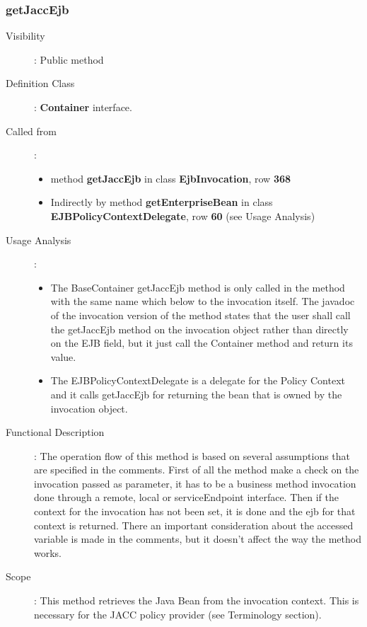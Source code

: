 \documentclass[11pt, a4paper,titlepage]{article}
\begin{document}
	 \subsubsection{getJaccEjb}
	 \begin{description}
	 	\item[Visibility]: Public method
	 	\item[Definition Class]: \textbf{Container} interface.
	 	\item[Called from]: 
	 	\begin{itemize}
	 		\item method \textbf{getJaccEjb} in class \textbf{EjbInvocation}, row \textbf{368}
	 		\item Indirectly by method \textbf{getEnterpriseBean} in class \textbf{EJBPolicyContextDelegate}, row \textbf{60} (see Usage Analysis)
	 	\end{itemize}
	 	\item[Usage Analysis]: 
	 	\begin{itemize}
	 		\item The BaseContainer getJaccEjb method is only called in the method with the same name which below to the invocation itself. The javadoc of the invocation version of the method states that the user shall call the getJaccEjb method on the invocation object rather than directly on the EJB field, but it just call the Container method and return its value. \newline
	 		\item The EJBPolicyContextDelegate is a delegate for the Policy Context and it calls getJaccEjb for returning the bean that is owned by the invocation object.
	 	\end{itemize} 
	 	\item[Functional Description]: The operation flow of this method is based on several assumptions that are specified in the comments. \newline
	 	First of all the method make a check on the invocation passed as parameter, it has to be a business method invocation done through a remote, local or serviceEndpoint interface.
	 	Then if the context for the invocation has not been set, it is done and the ejb for that context is returned. There an important consideration about the accessed variable is made in the comments, but it doesn't affect the way the method works.
	 	\item[Scope]: This method retrieves the Java Bean from the invocation context. This is necessary for the JACC policy provider (see Terminology section). 
	 \end{description}
\end{document}
